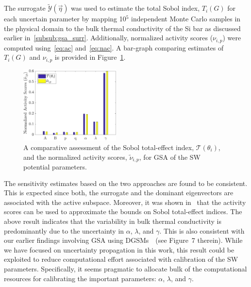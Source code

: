 The surrogate $\tilde{\mathcal{Y}}(\vec{\eta})$ was used to estimate the total Sobol index, $T_i(G)$ for each
uncertain parameter by mapping 10$^5$ independent Monte Carlo samples in the physical domain
to the bulk thermal conductivity of the Si bar as discussed earlier in~\ref{subsub:gsa_surr}. 
Additionally, normalized activity scores ($\nu_{i,p}$) were computed using~\eqref{eq:ac} and~\eqref{eq:nac}.
A bar-graph comparing estimates of $T_i(G)$ and $\nu_{i,p}$ is provided in
Figure~\ref{fig:gsa}. 
%
\begin{figure}[htbp]
\begin{center}
\includegraphics[width=0.45\textwidth]{./Figures/free_as_gsa}
\caption{A comparative assessment of the Sobol total-effect index, $\mathcal{T}(\theta_i)$, and the normalized
activity scores, $\tilde{\nu}_{i,p}$, for GSA of the SW potential parameters.}
\label{fig:gsa}
\end{center}
\end{figure}
%
The sensitivity estimates based on the two approaches are found to be consistent. This is expected since
both, the surrogate and the dominant eigenvectors are associated with the active subspace. Moreover, it
was shown in~\cite{Vohra:2018c} that the activity scores can be used to approximate the bounds on Sobol
total-effect indices. The above result indicates that the variability in bulk thermal conductivity is predominantly
due to the uncertainty in $\alpha$, $\lambda$, and $\gamma$. This is also consistent with our earlier
findings involving GSA using DGSMs~\cite{Vohra:2018b}~(see Figure~7 therein). While we have focused on uncertainty
propagation in this work, this result could be exploited to reduce computational effort associated with
calibration of the SW parameters. Specifically, it seems pragmatic to allocate bulk of the computational
resources for calibrating the important parameters: $\alpha$, $\lambda$, and $\gamma$.  
